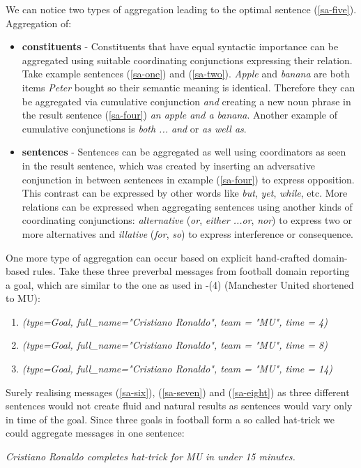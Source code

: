 We can notice two types of aggregation leading to the optimal sentence (\ref{sa-five}). Aggregation of:
\begin{itemize}
	\item \textbf{constituents} - Constituents that have equal syntactic importance can be aggregated using suitable coordinating conjunctions expressing their relation. Take example sentences (\ref{sa-one}) and (\ref{sa-two}). \emph{Apple} and \emph{banana} are both items \emph{Peter} bought so their semantic meaning is identical. Therefore they can be aggregated via cumulative conjunction \emph{and} creating a new noun phrase in the result sentence (\ref{sa-four}) \emph{an apple and a banana}. Another example of cumulative conjunctions is \emph{both ... and} or \emph{as well as}.
	\item \textbf{sentences} - Sentences can be aggregated as well using coordinators as seen in the result sentence, which was created by inserting an adversative conjunction in between sentences in example (\ref{sa-four}) to express opposition. This contrast can be expressed by other words like \emph{but}, \emph{yet}, \emph{while}, etc. More relations can be expressed when aggregating sentences using another kinds of coordinating conjunctions: \emph{alternative} (\emph{or}, \emph{either ...or}, \emph{nor}) to express two or more alternatives and \emph{illative} (\emph{for}, \emph{so}) to express interference or consequence.
\end{itemize}

One more type of aggregation can occur based on explicit hand-crafted domain-based rules. Take these three preverbal messages from football domain reporting a goal, which are similar to the one as used in -(4) (Manchester United shortened to MU):
\begin{enumerate}[resume]
	\item \emph{(type=Goal, full\_name="Cristiano Ronaldo", team = "MU", time = 4)}\label{sa-six}	
	\item \emph{(type=Goal, full\_name="Cristiano Ronaldo", team = "MU", time = 8)}\label{sa-seven}
	\item \emph{(type=Goal, full\_name="Cristiano Ronaldo", team = "MU", time = 14)}\label{sa-eight}	
\end{enumerate}

Surely realising messages (\ref{sa-six}), (\ref{sa-seven}) and (\ref{sa-eight}) as three different sentences would not create fluid and natural results as sentences would vary only in time of the goal. Since three goals in football form a so called hat-trick we could aggregate messages in one sentence:
\begin{center}
	\emph{Cristiano Ronaldo completes hat-trick for MU in under 15 minutes.}
\end{center}

